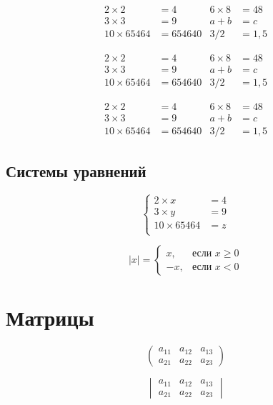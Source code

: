 \documentclass[a4paper,12pt]{article} %
\begin{document}
\begin{align*}
	2\times 2 &= 4 & 6\times 8 &= 48 \\
	3\times 3 &= 9 & a+b &= c\\
	10 \times 65464 &= 654640 & 3/2&=1,5
\end{align*}

\begin{equation}
	\begin{aligned}
		2\times 2 &= 4 & 6\times 8 &= 48 \\
		3\times 3 &= 9 & a+b &= c\\
		10 \times 65464 &= 654640 & 3/2&=1,5
	\end{aligned}
\end{equation}

\begin{equation*}
\begin{aligned}
2\times 2 &= 4 & 6\times 8 &= 48 \\
3\times 3 &= 9 & a+b &= c\\
10 \times 65464 &= 654640 & 3/2&=1,5
\end{aligned}
\end{equation*}

\subsection{Системы уравнений}

\[
	\left\{
		\begin{aligned}
			2\times x &= 4  \\
			3\times y &= 9\\
			10 \times 65464 &= z\\
		\end{aligned}
	\right.
\]

\[
	|x|=\begin{cases}
		x, &\text{если }  x \ge 0 \\
		-x, &\text{если } x<0
	\end{cases}
\]

\section{Матрицы}

\[
	\begin{pmatrix}
		a_{11} & a_{12} & a_{13} \\
		a_{21} & a_{22} & a_{23}
	\end{pmatrix}
\]

\[
	\begin{vmatrix}
		a_{11} & a_{12} & a_{13} \\
		a_{21} & a_{22} & a_{23}
	\end{vmatrix}
\]
\end{document}
